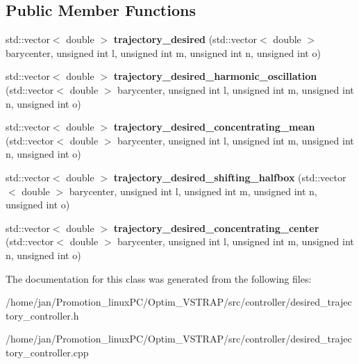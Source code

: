 \subsection*{Public Member Functions}
\begin{DoxyCompactItemize}
\item 
\mbox{\label{classdesired__trajectory__controller_a42f8709a5746225c11b986d4587be874}} 
std\+::vector$<$ double $>$ {\bfseries trajectory\+\_\+desired} (std\+::vector$<$ double $>$ barycenter, unsigned int l, unsigned int m, unsigned int n, unsigned int o)
\item 
\mbox{\label{classdesired__trajectory__controller_a631fe1886a690d80364457fec3dfca86}} 
std\+::vector$<$ double $>$ {\bfseries trajectory\+\_\+desired\+\_\+harmonic\+\_\+oscillation} (std\+::vector$<$ double $>$ barycenter, unsigned int l, unsigned int m, unsigned int n, unsigned int o)
\item 
\mbox{\label{classdesired__trajectory__controller_aa53734f2e492ea493b228bbf7518c421}} 
std\+::vector$<$ double $>$ {\bfseries trajectory\+\_\+desired\+\_\+concentrating\+\_\+mean} (std\+::vector$<$ double $>$ barycenter, unsigned int l, unsigned int m, unsigned int n, unsigned int o)
\item 
\mbox{\label{classdesired__trajectory__controller_a419e99f0f6be54bbba4b68bb0e45bf32}} 
std\+::vector$<$ double $>$ {\bfseries trajectory\+\_\+desired\+\_\+shifting\+\_\+halfbox} (std\+::vector$<$ double $>$ barycenter, unsigned int l, unsigned int m, unsigned int n, unsigned int o)
\item 
\mbox{\label{classdesired__trajectory__controller_ace11aeb778e779d8a7dc2eddec4c4a9d}} 
std\+::vector$<$ double $>$ {\bfseries trajectory\+\_\+desired\+\_\+concentrating\+\_\+center} (std\+::vector$<$ double $>$ barycenter, unsigned int l, unsigned int m, unsigned int n, unsigned int o)
\end{DoxyCompactItemize}


The documentation for this class was generated from the following files\+:\begin{DoxyCompactItemize}
\item 
/home/jan/\+Promotion\+\_\+linux\+P\+C/\+Optim\+\_\+\+V\+S\+T\+R\+A\+P/src/controller/desired\+\_\+trajectory\+\_\+controller.\+h\item 
/home/jan/\+Promotion\+\_\+linux\+P\+C/\+Optim\+\_\+\+V\+S\+T\+R\+A\+P/src/controller/desired\+\_\+trajectory\+\_\+controller.\+cpp\end{DoxyCompactItemize}
